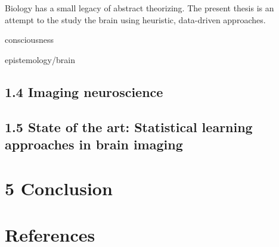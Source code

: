\documentclass[authoryear,review,3p]{elsarticle}
\begin{document}
Biology has a small legacy of abstract theorizing.
The present thesis is an attempt to the study the brain using
heuristic, data-driven approaches.



consciousness


epistemology/brain




\subsection*{1.4 Imaging neuroscience}






\subsection*{1.5 State of the art: Statistical learning approaches in brain imaging}





\section*{5 Conclusion}






\bigskip
\section*{References}



\end{document}
